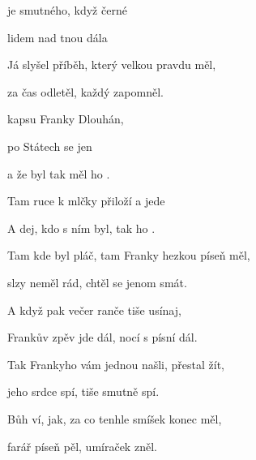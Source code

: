 

\zs
{} je smutného,
když  černé 

lidem nad  tnou dála

Já slyšel příběh, který velkou pravdu měl,

za čas odletěl, každý zapomněl.
\ks

\zr
{} kapsu  Franky Dlouhán,

po Státech  se jen 

a že byl  tak  měl ho .

Tam ruce k  mlčky přiloží
a 
jede 

A dej, kdo s ním
 byl, tak ho  .
\kr

\zs
Tam kde byl pláč, tam Franky hezkou píseň měl,

slzy neměl rád, chtěl se jenom smát.

A když pak večer ranče tiše usínaj,

Frankův zpěv jde dál, nocí s písní dál.
\ks

\zr \kr

\zs
Tak Frankyho vám jednou našli, přestal žít,

jeho srdce spí, tiše smutně spí.

Bůh ví, jak, za co tenhle smíšek konec měl,

farář píseň pěl, umíraček zněl.
\ks
\kp










